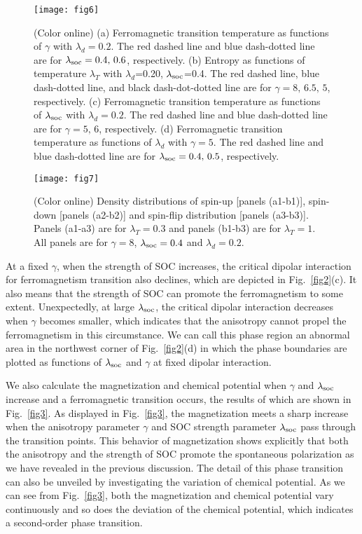 \documentclass[twocolumn,english,pra,superscriptaddress]{revtex4-1}
\begin{document}
\begin{figure}
	\texttt{[image: fig6]}%
	\caption{(Color online) (a) Ferromagnetic transition temperature as functions of $\gamma$ with $\lambda_{d}=0.2$. The red dashed line and  blue dash-dotted line are for $\lambda_{\rm soc}=0.4,\,0.6$, respectively. (b) Entropy as functions of temperature $\lambda_{T}$ with $\lambda_{d}$=0.20, $\lambda_{\rm soc}$=0.4. The red dashed line, blue dash-dotted line, and black dash-dot-dotted line are for $\gamma=8,\,6.5,\,5$, respectively. (c) Ferromagnetic transition temperature as functions of $\lambda_{\rm soc}$ with $\lambda_{d}=0.2$. The red dashed line and  blue dash-dotted line are for $\gamma=5,\,6$, respectively. (d) Ferromagnetic transition temperature as functions of $\lambda_{d}$ with $\gamma=5$. The red dashed line and  blue dash-dotted line are for $\lambda_{\rm soc}=0.4,\,0.5$, respectively.  }\label{fig6}
\end{figure}
\begin{figure*}
	\texttt{[image: fig7]}%
	\caption{(Color online) Density distributions of spin-up [panels (a1-b1)], spin-down [panels (a2-b2)] and spin-flip distribution [panels (a3-b3)]. Panels (a1-a3) are for $\lambda_{T}=0.3$ and panels (b1-b3) are for $\lambda_{T}=1$. All panels are for $\gamma=8$, $\lambda_{\rm soc}=0.4$ and $\lambda_{d}=0.2$.}\label{fig7}
\end{figure*}
 At a fixed $\gamma$, when the strength of SOC increases, the critical dipolar interaction for ferromagnetism transition also declines, which are depicted in Fig.~\ref{fig2}(c). It also means that the strength of SOC can promote the ferromagnetism to some extent. Unexpectedly, at large $\lambda_{\rm soc}$, the critical dipolar interaction decreases when $\gamma$ becomes smaller, which indicates that the anisotropy cannot propel the ferromagnetism in this circumstance. We can call this phase region an abnormal area in the northwest corner of Fig.~\ref{fig2}(d) in which the phase boundaries are plotted as functions of $\lambda_{\rm soc}$ and $\gamma$ at fixed dipolar interaction. \par

We also calculate the magnetization and chemical potential when $\gamma$ and $\lambda_{\rm soc}$ increase and a ferromagnetic transition occurs, the results of which are shown in Fig.~\ref{fig3}. As displayed in Fig.~\ref{fig3}, the magnetization meets a sharp increase when the anisotropy parameter $\gamma$ and SOC strength parameter $\lambda_{\rm soc}$ pass through the transition points. This behavior of magnetization shows explicitly that both the anisotropy and the strength of SOC promote the spontaneous polarization as we have revealed in the previous discussion. The detail of this phase transition can also be unveiled by investigating the variation of chemical potential. As we can see from Fig.~\ref{fig3}, both the magnetization and chemical potential vary continuously and so does the deviation of the chemical potential, which indicates a second-order phase transition. \par
\end{document}
